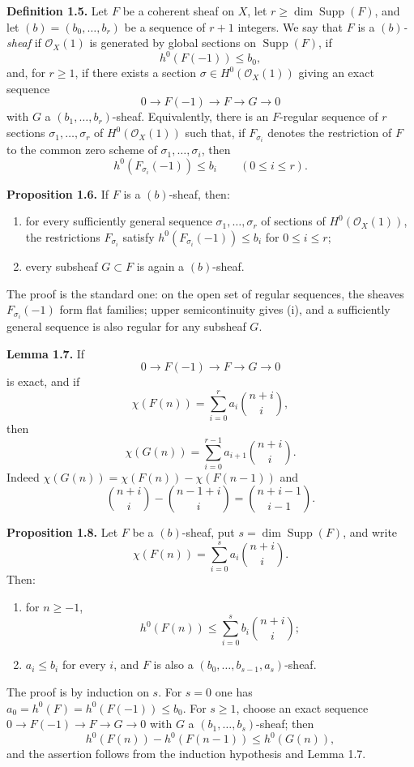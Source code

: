 \documentclass[11pt]{article}
\begin{document}
\textbf{Definition 1.5.} Let $F$ be a coherent sheaf on $X$, let $r\geq\dim\operatorname{Supp}(F)$, and let $(b)=(b_0,\ldots,b_r)$ be a sequence of $r+1$ integers. We say that $F$ is a \emph{$(b)$-sheaf} if $\mathcal O_X(1)$ is generated by global sections on $\operatorname{Supp}(F)$, if
\[
 h^0(F(-1))\le b_0,
\]
and, for $r\ge1$, if there exists a section $\sigma\in H^0(\mathcal O_X(1))$ giving an exact sequence
\[
0\longrightarrow F(-1)\longrightarrow F\longrightarrow G\longrightarrow0
\]
with $G$ a $(b_1,\ldots,b_r)$-sheaf. Equivalently, there is an $F$-regular sequence of $r$ sections $\sigma_1,\ldots,\sigma_r$ of $H^0(\mathcal O_X(1))$ such that, if $F_{\sigma_i}$ denotes the restriction of $F$ to the common zero scheme of $\sigma_1,\ldots,\sigma_i$, then
\[
 h^0(F_{\sigma_i}(-1))\le b_i\qquad(0\le i\le r).
\]

\textbf{Proposition 1.6.} If $F$ is a $(b)$-sheaf, then:
\begin{enumerate}[label=\roman*)]
\item for every sufficiently general sequence $\sigma_1,\ldots,\sigma_r$ of sections of $H^0(\mathcal O_X(1))$, the restrictions $F_{\sigma_i}$ satisfy $h^0(F_{\sigma_i}(-1))\le b_i$ for $0\le i\le r$;
\item every subsheaf $G\subset F$ is again a $(b)$-sheaf.
\end{enumerate}
The proof is the standard one: on the open set of regular sequences, the sheaves $F_{\sigma_i}(-1)$ form flat families; upper semicontinuity gives (i), and a sufficiently general sequence is also regular for any subsheaf $G$.

\textbf{Lemma 1.7.} If
\[
0\to F(-1)\to F\to G\to0
\]
is exact, and if
\[
 \chi(F(n))=\sum_{i=0}^r a_i\binom{n+i}{i},
\]
then
\[
 \chi(G(n))=\sum_{i=0}^{r-1}a_{i+1}\binom{n+i}{i}.
\]
Indeed $\chi(G(n))=\chi(F(n))-\chi(F(n-1))$ and
\[
 \binom{n+i}{i}-{n-1+i\choose i}=\binom{n+i-1}{i-1}.
\]

\textbf{Proposition 1.8.} Let $F$ be a $(b)$-sheaf, put $s=\dim\operatorname{Supp}(F)$, and write
\[
 \chi(F(n))=\sum_{i=0}^s a_i\binom{n+i}{i}.
\]
Then:
\begin{enumerate}[label=\roman*)]
\item for $n\ge -1$,
\[
 h^0(F(n))\le \sum_{i=0}^s b_i\binom{n+i}{i};
\]
\item $a_i\le b_i$ for every $i$, and $F$ is also a $(b_0,\ldots,b_{s-1},a_s)$-sheaf.
\end{enumerate}
The proof is by induction on $s$. For $s=0$ one has $a_0=h^0(F)=h^0(F(-1))\le b_0$. For $s\ge1$, choose an exact sequence $0\to F(-1)\to F\to G\to0$ with $G$ a $(b_1,\ldots,b_s)$-sheaf; then
\[
 h^0(F(n))-h^0(F(n-1))\le h^0(G(n)),
\]
and the assertion follows from the induction hypothesis and Lemma 1.7.
\end{document}
